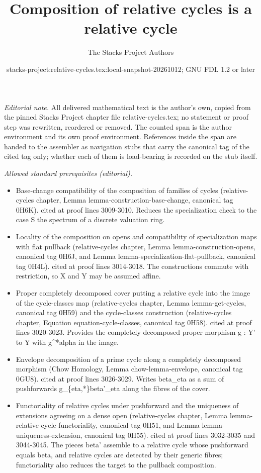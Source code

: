 \documentclass{stacks-project}
\title{Composition of relative cycles is a relative cycle}
\author{The Stacks Project Authors}
\date{stacks-project:relative-cycles.tex:local-snapshot-20261012; GNU FDL 1.2 or later}
\theoremstyle{plain}
\theoremstyle{definition}
\theoremstyle{remark}
\numberwithin{equation}{subsection}
\begin{document}
\maketitle
\setcounter{subsection}{1}
\noindent\textit{Editorial note.} All delivered mathematical text is the author's own, copied from the pinned Stacks Project chapter file relative-cycles.tex; no statement or proof step was rewritten, reordered or removed. The counted span is the author environment and its own proof environment. References inside the span are handed to the assembler as navigation stubs that carry the canonical tag of the cited tag only; whether each of them is load-bearing is recorded on the stub itself.\par\medskip
\noindent\textit{Allowed standard prerequisites (editorial).}\begin{itemize}
\item Base-change compatibility of the composition of families of cycles (relative-cycles chapter, Lemma lemma-construction-base-change, canonical tag 0H6K). cited at proof lines 3009-3010. Reduces the specialization check to the case S the spectrum of a discrete valuation ring.
\item Locality of the composition on opens and compatibility of specialization maps with flat pullback (relative-cycles chapter, Lemma lemma-construction-opens, canonical tag 0H6J, and Lemma lemma-specialization-flat-pullback, canonical tag 0H4L). cited at proof lines 3014-3018. The constructions commute with restriction, so X and Y may be assumed affine.
\item Proper completely decomposed cover putting a relative cycle into the image of the cycle-classes map (relative-cycles chapter, Lemma lemma-get-cycles, canonical tag 0H59) and the cycle-classes construction (relative-cycles chapter, Equation equation-cycle-classes, canonical tag 0H58). cited at proof lines 3020-3023. Provides the completely decomposed proper morphism g : Y' to Y with g\textasciicircum{}*alpha in the image.
\item Envelope decomposition of a prime cycle along a completely decomposed morphism (Chow Homology, Lemma chow-lemma-envelope, canonical tag 0GU8). cited at proof lines 3026-3029. Writes beta\_eta as a sum of pushforwards g\_\{eta,*\}beta'\_eta along the fibres of the cover.
\item Functoriality of relative cycles under pushforward and the uniqueness of extensions agreeing on a dense open (relative-cycles chapter, Lemma lemma-relative-cycle-functoriality, canonical tag 0H51, and Lemma lemma-uniqueness-extension, canonical tag 0H55). cited at proof lines 3032-3035 and 3044-3045. The pieces beta' assemble to a relative cycle whose pushforward equals beta, and relative cycles are detected by their generic fibres; functoriality also reduces the target to the pullback composition.

\end{itemize}
\end{document}
